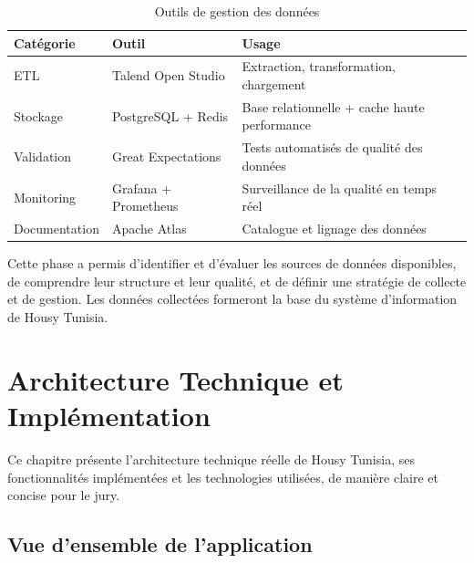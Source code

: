 \documentclass[12pt, a4paper]{report}
\begin{document}
\begin{table}[h]
\centering
\caption{Outils de gestion des données}
\begin{tabular}{|l|l|p{5cm}|}
\hline
\textbf{Catégorie} & \textbf{Outil} & \textbf{Usage} \\
\hline
ETL & Talend Open Studio & Extraction, transformation, chargement \\
\hline
Stockage & PostgreSQL + Redis & Base relationnelle + cache haute performance \\
\hline
Validation & Great Expectations & Tests automatisés de qualité des données \\
\hline
Monitoring & Grafana + Prometheus & Surveillance de la qualité en temps réel \\
\hline
Documentation & Apache Atlas & Catalogue et lignage des données \\
\hline
\end{tabular}
\end{table}

\begin{resultbox}
Cette phase a permis d'identifier et d'évaluer les sources de données disponibles, de comprendre leur structure et leur qualité, et de définir une stratégie de collecte et de gestion. Les données collectées formeront la base du système d'information de Housy Tunisia.
\end{resultbox}


\chapter{Architecture Technique et Implémentation}

\begin{objectivebox}
Ce chapitre présente l'architecture technique réelle de Housy Tunisia, ses fonctionnalités implémentées et les technologies utilisées, de manière claire et concise pour le jury.
\end{objectivebox}

\section{Vue d'ensemble de l'application}
\end{document}
